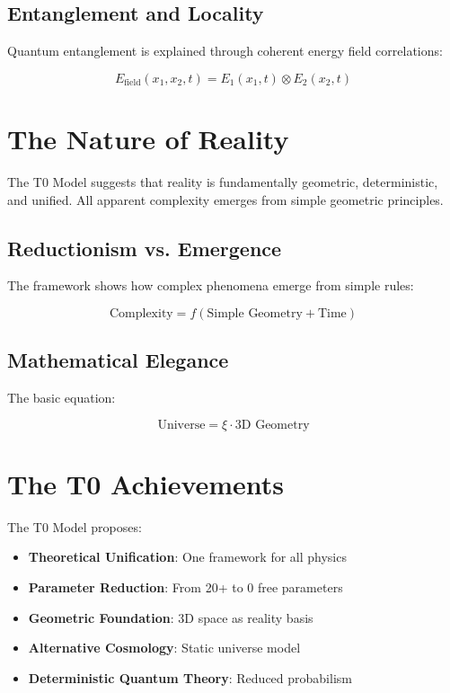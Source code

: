 	\subsection{Entanglement and Locality}
	
	Quantum entanglement is explained through coherent energy field correlations:
	
	\begin{equation}
		E_{\text{field}}(x_1, x_2, t) = E_1(x_1,t) \otimes E_2(x_2,t)
	\end{equation}
	
	
	\section{The Nature of Reality}
	
	\begin{insight}
		The T0 Model suggests that reality is fundamentally geometric, deterministic, and unified. All apparent complexity emerges from simple geometric principles.
	\end{insight}
	
	\subsection{Reductionism vs. Emergence}
	
	The framework shows how complex phenomena emerge from simple rules:
	
	\begin{equation}
		\text{Complexity} = f(\text{Simple Geometry} + \text{Time})
	\end{equation}
	
	\subsection{Mathematical Elegance}
	
	The basic equation:
	
	\begin{equation}
		\boxed{\text{Universe} = \xi \cdot \text{3D Geometry}}
	\end{equation}
	
	
	\section{The T0 Achievements}
	
	The T0 Model proposes:
	
	\begin{itemize}
		\item \textbf{Theoretical Unification}: One framework for all physics
		\item \textbf{Parameter Reduction}: From 20+ to 0 free parameters
		\item \textbf{Geometric Foundation}: 3D space as reality basis
		\item \textbf{Alternative Cosmology}: Static universe model
		\item \textbf{Deterministic Quantum Theory}: Reduced probabilism
	\end{itemize}
	
